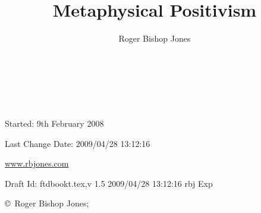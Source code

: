 \documentclass[10pt,titlepage]{article}
\author{Roger Bishop Jones}
\title{Metaphysical Positivism}
\date{\ }
\begin{document}
\begin{titlepage}
\maketitle

\ 
\\

\vfill

\begin{centering}

{\footnotesize

Started: 9th February 2008

Last Change $ $Date: 2009/04/28 13:12:16 $ $

\href{http://www.rbjones.com/}{www.rbjones.com}

Draft $ $Id: ftdbookt.tex,v 1.5 2009/04/28 13:12:16 rbj Exp $ $

\copyright\ Roger Bishop Jones;

}%

\end{centering}

\thispagestyle{empty}
\end{titlepage}

{\parskip=0pt\tableofcontents}
\end{document}
